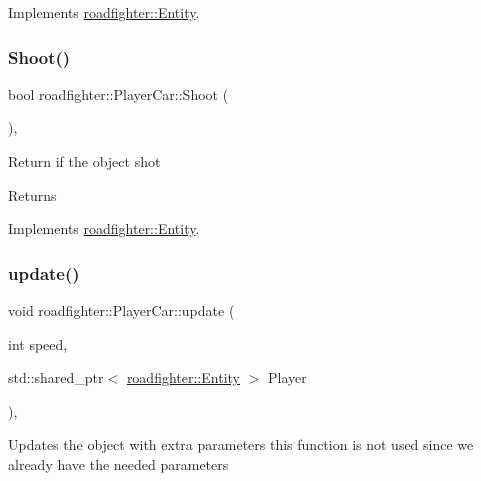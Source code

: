 Implements \hyperlink{classroadfighter_1_1Entity_a07e973f0fa941a69e749629716877692}{roadfighter\+::\+Entity}.

\mbox{\label{classroadfighter_1_1PlayerCar_af9e034824497fb287085be08c3995733}} 
\subsubsection{\texorpdfstring{Shoot()}{Shoot()}}
{\footnotesize\ttfamily bool roadfighter\+::\+Player\+Car\+::\+Shoot (\begin{DoxyParamCaption}{ }\end{DoxyParamCaption})\hspace{0.3cm}{\ttfamily [override]}, {\ttfamily [virtual]}}

Return if the object shot \begin{DoxyReturn}{Returns}

\end{DoxyReturn}


Implements \hyperlink{classroadfighter_1_1Entity_ad0ecaa0539db252e591da83814251509}{roadfighter\+::\+Entity}.

\mbox{\label{classroadfighter_1_1PlayerCar_a65daed6d30d8b65f368779eaa43714e2}} 
\subsubsection{\texorpdfstring{update()}{update()}\hspace{0.1cm}{\footnotesize\ttfamily [1/2]}}
{\footnotesize\ttfamily void roadfighter\+::\+Player\+Car\+::update (\begin{DoxyParamCaption}\item[{int}]{speed,  }\item[{std\+::shared\+\_\+ptr$<$ \hyperlink{classroadfighter_1_1Entity}{roadfighter\+::\+Entity} $>$}]{Player }\end{DoxyParamCaption})\hspace{0.3cm}{\ttfamily [override]}, {\ttfamily [virtual]}}

Updates the object with extra parameters this function is not used since we already have the needed parameters


